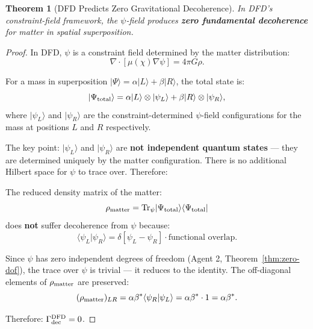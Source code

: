 \documentclass[11pt,a4paper]{article}
\newtheorem{theorem}{Theorem}
\begin{document}
\begin{theorem}[DFD Predicts Zero Gravitational Decoherence]
\label{thm:zero-decoherence}
In DFD's constraint-field framework, the $\psi$-field produces \textbf{zero fundamental decoherence} for matter in spatial superposition.
\end{theorem}

\begin{proof}
In DFD, $\psi$ is a constraint field determined by the matter distribution:
\begin{equation}
\nabla\cdot[\mu(\chi)\nabla\psi] = 4\pi G\rho.
\end{equation}

For a mass in superposition $|\Psi\rangle = \alpha|L\rangle + \beta|R\rangle$, the total state is:
\begin{equation}
|\Psi_{\rm total}\rangle = \alpha|L\rangle\otimes|\psi_L\rangle + \beta|R\rangle\otimes|\psi_R\rangle,
\end{equation}
where $|\psi_L\rangle$ and $|\psi_R\rangle$ are the constraint-determined $\psi$-field configurations for the mass at positions $L$ and $R$ respectively.

The key point: $|\psi_L\rangle$ and $|\psi_R\rangle$ are \textbf{not independent quantum states} --- they are determined uniquely by the matter configuration. There is no additional Hilbert space for $\psi$ to trace over. Therefore:

The reduced density matrix of the matter:
\begin{equation}
\rho_{\rm matter} = \text{Tr}_\psi|\Psi_{\rm total}\rangle\langle\Psi_{\rm total}|
\end{equation}
does \textbf{not} suffer decoherence from $\psi$ because:
\begin{equation}
\langle\psi_L|\psi_R\rangle = \delta[\psi_L - \psi_R] \cdot \text{functional overlap}.
\end{equation}

Since $\psi$ has zero independent degrees of freedom (Agent 2, Theorem~\ref{thm:zero-dof}), the trace over $\psi$ is trivial --- it reduces to the identity. The off-diagonal elements of $\rho_{\rm matter}$ are preserved:
\begin{equation}
(\rho_{\rm matter})_{LR} = \alpha\beta^*\langle\psi_R|\psi_L\rangle = \alpha\beta^*\cdot 1 = \alpha\beta^*.
\end{equation}

Therefore: $\Gamma_{\rm dec}^{\rm DFD} = 0$.
\end{proof}
\end{document}
